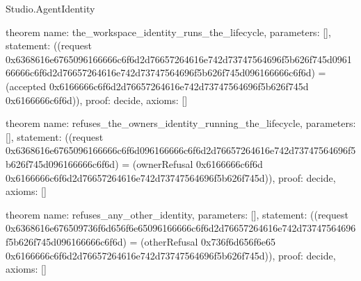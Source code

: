 \begin{lexlean}{Studio.AgentIdentity}
\begin{semanticmodule}
theorem{
  name: the_workspace_identity_runs_the_lifecycle,
  parameters: [],
  statement: ((request 0x6368616e6765096166666c6f6d2d76657264616e742d73747564696f5b626f745d096166666c6f6d2d76657264616e742d73747564696f5b626f745d096166666c6f6d) = (accepted 0x6166666c6f6d2d76657264616e742d73747564696f5b626f745d 0x6166666c6f6d)),
  proof: decide{},
  axioms: []
}

theorem{
  name: refuses_the_owners_identity_running_the_lifecycle,
  parameters: [],
  statement: ((request 0x6368616e6765096166666c6f6d096166666c6f6d2d76657264616e742d73747564696f5b626f745d096166666c6f6d) = (ownerRefusal 0x6166666c6f6d 0x6166666c6f6d2d76657264616e742d73747564696f5b626f745d)),
  proof: decide{},
  axioms: []
}

theorem{
  name: refuses_any_other_identity,
  parameters: [],
  statement: ((request 0x6368616e676509736f6d656f6e65096166666c6f6d2d76657264616e742d73747564696f5b626f745d096166666c6f6d) = (otherRefusal 0x736f6d656f6e65 0x6166666c6f6d2d76657264616e742d73747564696f5b626f745d)),
  proof: decide{},
  axioms: []
}
\end{semanticmodule}
\end{lexlean}
